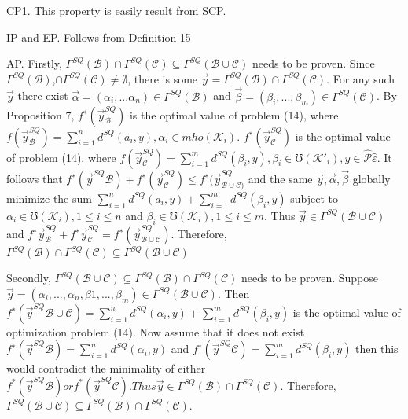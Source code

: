 \documentclass[10pt,a4paper]{IOS-Book-Article}
\begin{document}
CP1. This property is easily result from SCP.

IP and EP. Follows from Definition 15

AP. Firstly, $\Gamma^{SQ}(\mathcal{B}) \cap \Gamma^{SQ}(\mathcal{C}) \subseteq \Gamma^{SQ}(\mathcal{B} \cup \mathcal{C})$ needs to be proven. Since $\Gamma^{SQ}(\mathcal{B})$,$\cap\Gamma^{SQ}(\mathcal{C}) \neq \emptyset$, there is some $\vec{y} = \Gamma^{SQ}(\mathcal{B}) \cap \Gamma^{SQ}(\mathcal{C})$. For any such $\vec{y}$ there exist $\vec{\alpha} = (\alpha_i, ... \alpha_n) \in \Gamma^{SQ}(\mathcal{B})$ and $\vec{\beta}= (\beta_i, ... , \beta_m) \in \Gamma^{SQ}(\mathcal{C})$. By Proposition 7, $f^∗(\vec{y}^{SQ}_\mathcal{B})$ is the optimal value of problem (14), where $f(\vec{y}^{SQ}_\mathcal{B} ) = \sum^n_{i=1} d^{SQ}(a_i, y), \alpha_i \in mho(\mathcal{K}_i)$. $f^∗(\vec{y}^{SQ}_\mathcal{C} )$ is the optimal value of problem (14), where $f (\vec{y}^{SQ}_\mathcal{C} ) = \sum^m_{i=1} d^{SQ}(\beta_i, y), \beta_i \in \mho(\mathcal{K}'_i), y \in \hat{\mathcal{P}} {\hat{\varepsilon}}$. It follows that $f^∗(\vec{y}^{SQ} \mathcal{B} ) + f^∗(\vec{y}^{SQ}_\mathcal{C} ) \le f^∗(\vec{y}^{SQ}_{\mathcal{B}\cup\mathcal{C})}$ and the same $\vec{y}, \vec{\alpha}, \vec{\beta}$ globally minimize the sum $\sum^n_{i=1} d^{SQ}(a_i, y) +\sum^m_{i=1} d^{SQ}(\beta_i, y)$ subject to $\alpha_i \in \mho(\mathcal{K}_i), 1 \le i \le n$ and $\beta_i \in \mho(\mathcal{K}_i), 1 \le i \le m$. Thus $\vec{y} \in \Gamma^{SQ}(\mathcal{B} \cup \mathcal{C})$ and $f^∗\vec{y}^{SQ}_\mathcal{B} + f^∗\vec{y}^{SQ}_\mathcal{C} = f^∗(\vec{y}^{SQ}_{\mathcal{B}\cup\mathcal{C}})$. Therefore, $\Gamma^{SQ}(\mathcal{B}) \cap \Gamma^{SQ}(\mathcal{C}) \subseteq \Gamma^{SQ}(\mathcal{B} \cup \mathcal{C})$

Secondly, $\Gamma^{SQ}(\mathcal{B} \cup \mathcal{C}) \subseteq \Gamma^{SQ}(\mathcal{B}) \cap \Gamma^{SQ}(\mathcal{C})$ needs to be proven. Suppose $\vec{y} = (\alpha_i, ..., \alpha_n, \beta1, ..., \beta_m) \in \Gamma^{SQ}(\mathcal{B} \cup \mathcal{C})$. Then $f^∗(\vec{y}^{SQ}\mathcal{B}\cup\mathcal{C})=\sum^n_{i=1} d^{SQ} (\alpha_i, y) +\sum^m_{i=1} d^{SQ}(\beta_i, y)$ is the optimal value of optimization problem (14). Now assume that it does not exist $f^∗(\vec{y}^{SQ}\mathcal{B} ) = \sum^n_{i=1} d^{SQ}(\alpha_i, y)$ and $f^∗(\vec{y}^{SQ}\mathcal{C} ) = \sum^m_{i=1} d^{SQ}(\beta_i, y)$ then this would contradict the minimality of either $f^*(\vec{y}^{SQ}\mathcal{B} ) or f^*(\vec{y}^{SQ}\mathcal{C} ). Thus \vec{y} \in \Gamma^{SQ}(\mathcal{B}) \cap \Gamma^{SQ}(\mathcal{C})$. Therefore, $\Gamma^{SQ}(\mathcal{B} \cup \mathcal{C}) \subseteq \Gamma^{SQ}(\mathcal{B}) \cap \Gamma^{SQ}(\mathcal{C})$.
\end{document}

